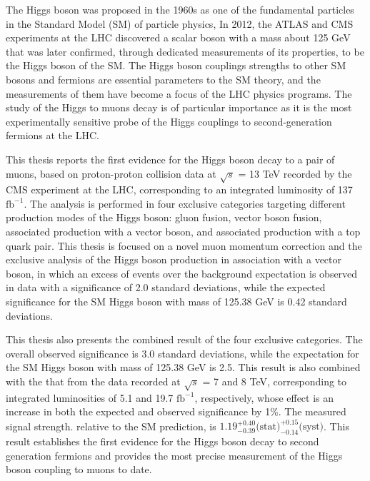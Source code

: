 
\hspace{2em} The Higgs boson was proposed in the 1960s as one of the fundamental particles in the Standard Model (SM) of particle physics,
In 2012, the ATLAS and CMS experiments at the LHC discovered a scalar boson with a mass about 125 GeV 
that was later confirmed, through dedicated measurements of its properties, to be the Higgs boson of the SM.
The Higgs boson couplings strengths to other SM bosons and fermions are essential parameters to the SM theory,
and the measurements of them have become a focus of the LHC physics programs.
The study of the Higgs to muons decay is of particular importance 
as it is the most experimentally sensitive probe of the Higgs couplings to second-generation fermions at the LHC.

This thesis reports the first evidence for the Higgs boson decay to a pair of muons,
based on proton-proton collision data at $\sqrt{s}$ = 13 TeV recorded by the CMS experiment at the LHC, 
corresponding to an integrated luminosity of 137 $\text{fb}^{-1}$.
The analysis is performed in four exclusive categories targeting different production modes of the Higgs boson:
gluon fusion, vector boson fusion, associated production with a vector boson, and associated production with a top quark pair.
This thesis is focused on a novel muon momentum correction and the exclusive analysis of the Higgs boson production in association with a vector boson,
in which an excess of events over the background expectation is observed in data with a significance of 2.0 standard deviations,
while the expected significance for the SM Higgs boson with mass of 125.38 GeV is 0.42 standard deviations.

This thesis also presents the combined result of the four exclusive categories. 
The overall observed significance is 3.0 standard deviations, 
while the expectation for the SM Higgs boson with mass of 125.38 GeV is 2.5.
This result is also combined with the that from the data recorded at $\sqrt{s}$ = 7 and 8 TeV, 
corresponding to integrated luminosities of 5.1 and 19.7 $\text{fb}^{-1}$, respectively,
whose effect is an increase in both the expected and observed significance by 1\%.
The measured signal strength. relative to the SM prediction, is $1.19^{+0.40}_{-0.39} \text{(stat)}^{+0.15}_{-0.14} \text{(syst)}$.
This result establishes the first evidence for the Higgs boson decay to second generation fermions
and provides the most precise measurement of the Higgs boson coupling to muons to date.